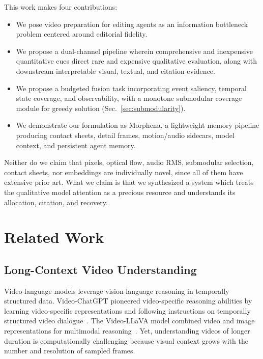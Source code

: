 \documentclass[conference]{IEEEtran}
\begin{document}
This work makes four contributions:

\begin{itemize}
    \item We pose video preparation for editing agents as an information bottleneck problem centered around editorial fidelity.
    \item We propose a dual-channel pipeline wherein comprehensive and inexpensive quantitative cues direct rare and expensive qualitative evaluation, along with downstream interpretable visual, textual, and citation evidence.
    \item We propose a budgeted fusion task incorporating event saliency, temporal state coverage, and observability, with a monotone submodular coverage module for greedy solution (Sec.~\ref{sec:submodularity}).
    \item We demonstrate our formulation as Morphena, a lightweight memory pipeline producing contact sheets, detail frames, motion/audio sidecars, model context, and persistent agent memory.
\end{itemize}

Neither do we claim that pixels, optical flow, audio RMS, submodular selection, contact sheets, nor embeddings are individually novel, since all of them have extensive prior art. What we claim is that we synthesized a system which treats the qualitative model attention as a precious resource and understands its allocation, citation, and recovery.


\section{Related Work}

\subsection{Long-Context Video Understanding}

Video-language models leverage vision-language reasoning in temporally structured data. Video-ChatGPT pioneered video-specific reasoning abilities by learning video-specific representations and following instructions on temporally structured video dialogue~\cite{maaz2024videochatgpt}. The Video-LLaVA model combined video and image representations for multimodal reasoning~\cite{lin2024videollava}. Yet, understanding videos of longer duration is computationally challenging because visual context grows with the number and resolution of sampled frames.
\end{document}
